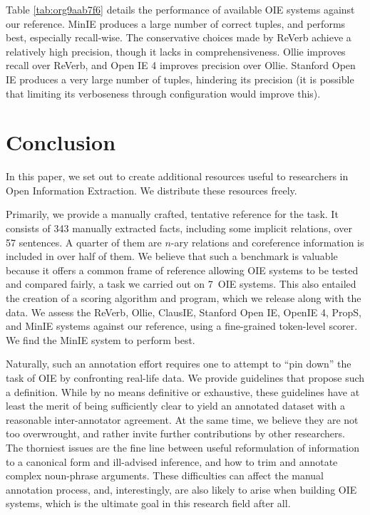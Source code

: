 \pdfoutput=1 \documentclass[11pt, a4paper]{article}
\begin{document}
Table \ref{tab:org9aab7f6} details the performance of available OIE systems against our
reference. MinIE produces a large number of correct tuples, and performs best, especially recall-wise. The conservative
choices made by ReVerb achieve a relatively high precision, though it lacks
in comprehensiveness. Ollie improves recall over ReVerb, and Open IE 4 improves precision over Ollie. Stanford Open IE produces a very large number of tuples, hindering its precision (it is possible that limiting its verboseness through configuration would improve this). 
\section{Conclusion}
\label{sec:orgad750a7}

In this paper, we set out to create additional resources useful to researchers in Open Information Extraction. We distribute these resources freely.

Primarily, we provide a manually crafted, tentative reference for the task. It consists of 343 manually extracted facts, including some implicit relations, over 57 sentences. A quarter of them are $n$-ary relations and coreference information is included in over half of them. We believe that such a benchmark is valuable because it offers a common frame of reference allowing OIE systems to be tested and compared fairly, a task we carried out on 7~OIE systems. This also entailed the creation of a scoring algorithm and program, which we release along with the data. We assess the ReVerb, Ollie, ClausIE, Stanford Open IE, OpenIE 4, PropS, and MinIE
systems against our reference, using a fine-grained token-level scorer. We find the MinIE system to perform best.

Naturally, such an annotation effort requires one to attempt to ``pin down'' the task of OIE by confronting real-life data. We provide guidelines that propose such a definition. While by no means definitive or exhaustive, these guidelines have at least the merit of being sufficiently clear to yield an annotated dataset with a reasonable inter-annotator agreement. At the same time, we believe they are not too overwrought, and rather invite further contributions by other researchers. The thorniest issues are the fine line between useful reformulation of information to a canonical form and ill-advised inference, and how to trim and annotate complex noun-phrase arguments. These difficulties can affect the manual annotation process, and, interestingly, are also likely to arise when building OIE systems, which is the ultimate goal in this research field after all.


{}
\end{document}
